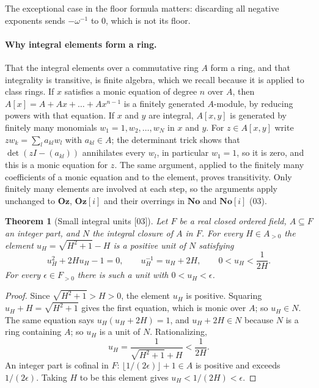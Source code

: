\documentclass[11pt,letterpaper]{article}
\numberwithin{equation}{section}
\newtheorem{theorem}{Theorem}[section]
\theoremstyle{definition}
\theoremstyle{remark}
\theoremstyle{plain}
\newcommand{\No}{\mathbf{No}}
\newcommand{\Oz}{\mathbf{Oz}}
\newcommand{\SC}{\No[i]}
\newcommand{\GOz}{\Oz[i]}
\newcommand{\src}[1]{\textup{\textsf{[#1]}}}
\begin{document}
The exceptional case in the floor formula matters: discarding all negative exponents sends
$-\omega^{-1}$ to $0$, which is not its floor.

\paragraph{Why integral elements form a ring.}
That the integral elements over a commutative ring $A$ form a ring, and that integrality is
transitive, is finite algebra, which we recall because it is applied to class rings. If
$x$ satisfies a monic equation of degree $n$ over $A$, then $A[x]=A+Ax+\dots+Ax^{n-1}$ is
a finitely generated $A$-module, by reducing powers with that equation. If $x$ and $y$ are
integral, $A[x,y]$ is generated by finitely many monomials $w_1=1,w_2,\dots,w_N$ in $x$
and $y$. For $z\in A[x,y]$ write $zw_k=\sum_la_{kl}w_l$ with $a_{kl}\in A$; the determinant
trick shows that $\det(zI-(a_{kl}))$ annihilates every $w_l$, in particular $w_1=1$, so it
is zero, and this is a monic equation for $z$. The same argument, applied to the finitely
many coefficients of a monic equation and to the element, proves transitivity. Only
finitely many elements are involved at each step, so the arguments apply unchanged to
$\Oz$, $\GOz$ and their overrings in $\No$ and $\SC$ (03).

\begin{theorem}[Small integral units \src{03}]\label{osq:nm:thm:smallunits}
Let $F$ be a real closed ordered field, $A\subseteq F$ an integer part, and $N$ the
integral closure of $A$ in $F$. For every $H\in A_{>0}$ the element
$u_H=\sqrt{H^2+1}-H$ is a positive unit of $N$ satisfying
\begin{equation}\label{osq:nm:eq:smallunit}
 u_H^2+2Hu_H-1=0,\qquad u_H^{-1}=u_H+2H,\qquad 0<u_H<\frac1{2H}.
\end{equation}
For every $\epsilon\in F_{>0}$ there is such a unit with $0<u_H<\epsilon$.
\end{theorem}

\begin{proof}
Since $\sqrt{H^2+1}>H>0$, the element $u_H$ is positive. Squaring
$u_H+H=\sqrt{H^2+1}$ gives the first equation, which is monic over $A$; so $u_H\in N$.
The same equation says $u_H(u_H+2H)=1$, and $u_H+2H\in N$ because $N$ is a ring containing
$A$; so $u_H$ is a unit of $N$. Rationalizing,
\[
 u_H=\frac{1}{\sqrt{H^2+1}+H}<\frac1{2H}.
\]
An integer part is cofinal in $F$: $\lfloor 1/(2\epsilon)\rfloor+1\in A$ is positive and
exceeds $1/(2\epsilon)$. Taking $H$ to be this element gives $u_H<1/(2H)<\epsilon$.
\end{proof}
\end{document}
